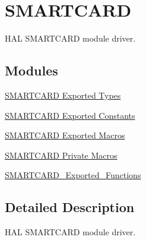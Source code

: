 \hypertarget{group___s_m_a_r_t_c_a_r_d}{}\section{S\+M\+A\+R\+T\+C\+A\+RD}
\label{group___s_m_a_r_t_c_a_r_d}


H\+AL S\+M\+A\+R\+T\+C\+A\+RD module driver.  


\subsection*{Modules}
\begin{DoxyCompactItemize}
\item 
\hyperlink{group___s_m_a_r_t_c_a_r_d___exported___types}{S\+M\+A\+R\+T\+C\+A\+R\+D Exported Types}
\item 
\hyperlink{group___s_m_a_r_t_c_a_r_d___exported___constants}{S\+M\+A\+R\+T\+C\+A\+R\+D Exported Constants}
\item 
\hyperlink{group___s_m_a_r_t_c_a_r_d___exported___macros}{S\+M\+A\+R\+T\+C\+A\+R\+D Exported Macros}
\item 
\hyperlink{group___s_m_a_r_t_c_a_r_d___private___macros}{S\+M\+A\+R\+T\+C\+A\+R\+D Private Macros}
\item 
\hyperlink{group___s_m_a_r_t_c_a_r_d___exported___functions}{S\+M\+A\+R\+T\+C\+A\+R\+D\+\_\+\+Exported\+\_\+\+Functions}
\end{DoxyCompactItemize}


\subsection{Detailed Description}
H\+AL S\+M\+A\+R\+T\+C\+A\+RD module driver. 

